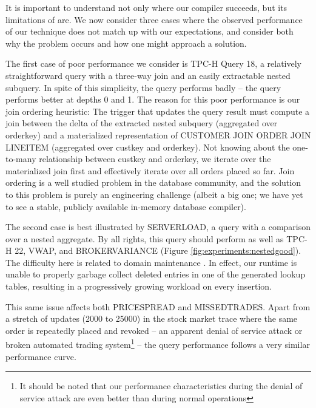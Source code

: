 It is important to understand not only where our compiler succeeds, but its limitations of are.  We now consider three cases where the observed performance of our technique does not match up with our expectations, and consider both why the problem occurs and how one might approach a solution.

The first case of poor performance we consider is TPC-H Query 18, a relatively straightforward query with a three-way join and an easily extractable nested subquery.  In spite of this simplicity, the query performs badly -- the query performs better at depths 0 and 1.  The reason for this poor performance is our join ordering heuristic: The trigger that updates the query result must compute a join between the delta of the extracted nested subquery (aggregated over orderkey) and a materialized representation of CUSTOMER JOIN ORDER JOIN LINEITEM (aggregated over custkey and orderkey).  Not knowing about the one-to-many relationship between custkey and orderkey, we iterate over the materialized join first and effectively iterate over all orders placed so far.  Join ordering is a well studied problem in the database community, and the solution to this problem is purely an engineering challenge (albeit a big one; we have yet to see a stable, publicly available in-memory database compiler).  

The second case is best illustrated by SERVERLOAD, a query with a comparison over a nested aggregate.  By all rights, this query should perform as well as TPC-H 22, VWAP, and BROKERVARIANCE (Figure \ref{fig:experiments:nestedgood}).  The difficulty here is related to domain maintenance .  In effect, our runtime is unable to properly garbage collect deleted entries in one of the generated lookup tables, resulting in a progressively growing workload on every insertion.  

This same issue affects both PRICESPREAD and MISSEDTRADES.  Apart from a stretch of updates (2000 to 25000) in the stock market trace where the same order is repeatedly placed and revoked -- an apparent denial of service attack or broken automated trading system\footnote{It should be noted that our performance characteristics during the denial of service attack are even better than during normal operations} -- the query performance follows a very similar performance curve.


